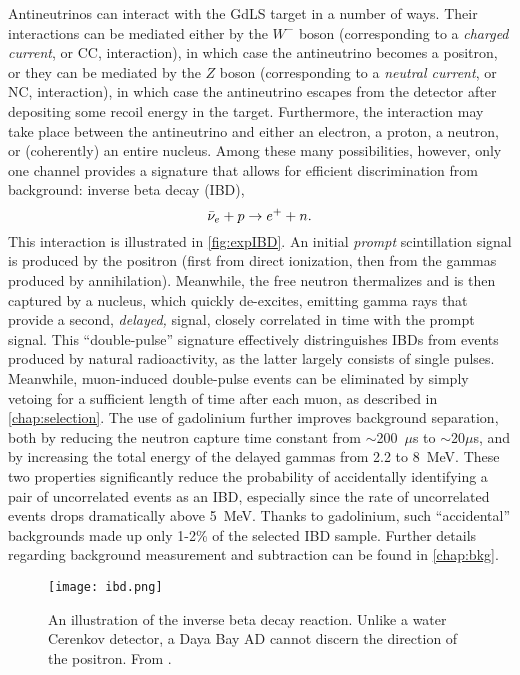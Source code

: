 \documentclass[../thesis.tex]{subfiles}
\begin{document}
Antineutrinos can interact with the GdLS target in a number of ways. Their
interactions can be mediated either by the $W^-$ boson (corresponding to a
\emph{charged current}, or CC, interaction), in which case the antineutrino
becomes a positron, or they can be mediated by the $Z$ boson (corresponding to a
\emph{neutral current}, or NC, interaction), in which case the antineutrino
escapes from the detector after depositing some recoil energy in the
target. Furthermore, the interaction may take place between the antineutrino and
either an electron, a proton, a neutron, or (coherently) an entire
nucleus. Among these many possibilities, however, only one channel provides a
signature that allows for efficient discrimination from background: inverse beta
decay (IBD),
\begin{equation*}
  \bar\nu_e + p \rightarrow e^+ + n.
\end{equation*}
This interaction is illustrated in \autoref{fig:expIBD}. An initial
\emph{prompt} scintillation signal is produced by the positron (first from
direct ionization, then from the gammas produced by annihilation). Meanwhile,
the free neutron thermalizes and is then captured by a nucleus, which quickly
de-excites, emitting gamma rays that provide a second, \emph{delayed,} signal,
closely correlated in time with the prompt signal. This ``double-pulse''
signature effectively distringuishes IBDs from events produced by natural
radioactivity, as the latter largely consists of single pulses. Meanwhile,
muon-induced double-pulse events can be eliminated by simply vetoing for a
sufficient length of time after each muon, as described in
\autoref{chap:selection}. The use of gadolinium further improves background
separation, both by reducing the neutron capture time constant from
$\sim$200~$\mu$s to $\sim$20$\mu$s, and by increasing the total energy of the
delayed gammas from 2.2 to 8~MeV. These two properties significantly reduce the
probability of accidentally identifying a pair of uncorrelated events as an IBD,
especially since the rate of uncorrelated events drops dramatically above
5~MeV. Thanks to gadolinium, such ``accidental'' backgrounds made up only 1-2\%
of the selected IBD sample. Further details regarding background measurement and
subtraction can be found in \autoref{chap:bkg}.

\begin{figure}[ht]
  \texttt{[image: ibd.png]}
  \caption{An illustration of the inverse beta decay reaction. Unlike a water
    Cerenkov detector, a Daya Bay AD cannot discern the direction of the
    positron. From \cite{Fernandez_2017}.}
  \label{fig:expIBD}
\end{figure}
\end{document}
